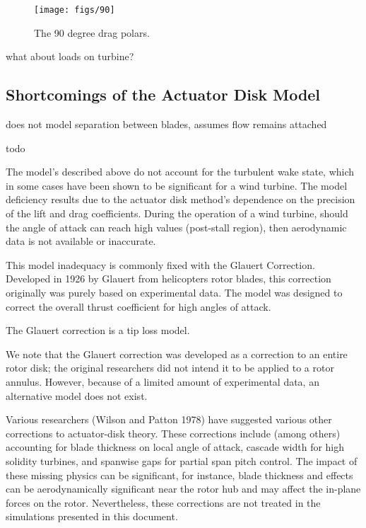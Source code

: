 \begin{figure}[!htb]
  \begin{center}
    \texttt{[image: figs/90]}
    \caption{The 90 degree drag polars.} 
    \label{fig:90_drag}
  \end{center}
\end{figure}

what about loads on turbine?

\subsection{Shortcomings of the Actuator Disk Model}
\label{subsec:wake_loss_model}

does not model separation between blades, assumes flow remains attached

todo

The model's described above do not account for the turbulent wake state,
which in some cases have been shown to be significant for a wind
turbine. The model deficiency results due to the actuator disk
method's dependence on the precision of the lift and drag
coefficients. During the operation of a wind turbine, should the angle
of attack can reach high values (post-stall region), then aerodynamic 
data is not available or inaccurate. 
   
This model inadequacy is commonly fixed with the Glauert Correction. 
Developed in 1926 by Glauert from helicopters rotor blades, this
correction originally was purely based on experimental data. The model
was designed to correct the overall thrust coefficient for high angles
of attack. 

The Glauert correction is a tip loss model.

We note that the Glauert correction was developed as a correction to an
entire rotor disk; the original researchers did not intend it to be
applied to a rotor annulus. However, because of a limited amount  of
experimental data, an alternative model does not exist.  

Various researchers\cite{?} (Wilson and Patton  1978) have suggested
various other corrections to actuator-disk theory. These corrections
include (among others) accounting for blade thickness on local angle of
attack, cascade width for high solidity turbines, and spanwise gaps for
partial span pitch control. The impact of these missing physics can be
significant, for instance, blade thickness and effects can be  
aerodynamically significant near the rotor hub and may affect the
in-plane forces on the rotor\cite{Moriarty_aerodyntheory}. Nevertheless,
these corrections are not treated in the simulations presented in this
document.  


